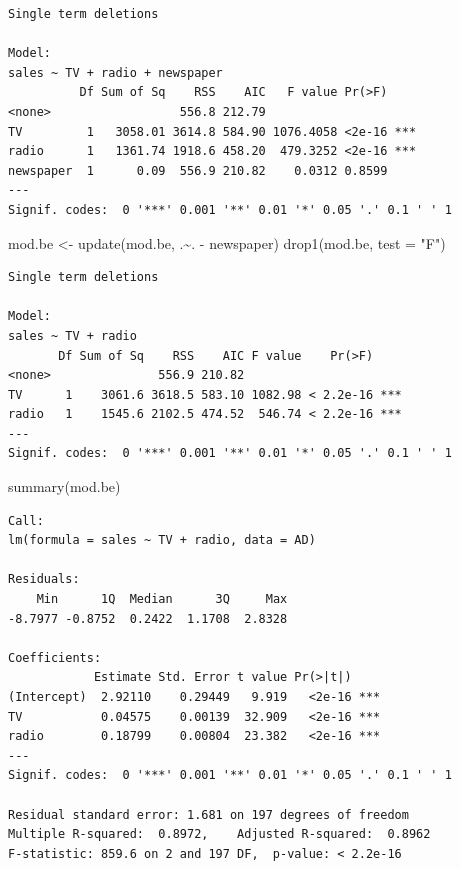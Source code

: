 \documentclass[
]{article}
\newenvironment{Shaded}{\begin{snugshade}}{\end{snugshade}}
\newcommand{\AttributeTok}[1]{\textcolor[rgb]{0.77,0.63,0.00}{#1}}
\newcommand{\FunctionTok}[1]{\textcolor[rgb]{0.00,0.00,0.00}{#1}}
\newcommand{\NormalTok}[1]{#1}
\newcommand{\OtherTok}[1]{\textcolor[rgb]{0.56,0.35,0.01}{#1}}
\newcommand{\SpecialCharTok}[1]{\textcolor[rgb]{0.00,0.00,0.00}{#1}}
\newcommand{\StringTok}[1]{\textcolor[rgb]{0.31,0.60,0.02}{#1}}
\begin{document}
\begin{verbatim}
Single term deletions

Model:
sales ~ TV + radio + newspaper
          Df Sum of Sq    RSS    AIC   F value Pr(>F)    
<none>                  556.8 212.79                     
TV         1   3058.01 3614.8 584.90 1076.4058 <2e-16 ***
radio      1   1361.74 1918.6 458.20  479.3252 <2e-16 ***
newspaper  1      0.09  556.9 210.82    0.0312 0.8599    
---
Signif. codes:  0 '***' 0.001 '**' 0.01 '*' 0.05 '.' 0.1 ' ' 1
\end{verbatim}

\begin{Shaded}
\begin{Highlighting}[]
\NormalTok{mod.be }\OtherTok{\textless{}{-}} \FunctionTok{update}\NormalTok{(mod.be, .}\SpecialCharTok{\textasciitilde{}}\NormalTok{. }\SpecialCharTok{{-}}\NormalTok{ newspaper)}
\FunctionTok{drop1}\NormalTok{(mod.be, }\AttributeTok{test =} \StringTok{"F"}\NormalTok{)}
\end{Highlighting}
\end{Shaded}

\begin{verbatim}
Single term deletions

Model:
sales ~ TV + radio
       Df Sum of Sq    RSS    AIC F value    Pr(>F)    
<none>               556.9 210.82                      
TV      1    3061.6 3618.5 583.10 1082.98 < 2.2e-16 ***
radio   1    1545.6 2102.5 474.52  546.74 < 2.2e-16 ***
---
Signif. codes:  0 '***' 0.001 '**' 0.01 '*' 0.05 '.' 0.1 ' ' 1
\end{verbatim}

\begin{Shaded}
\begin{Highlighting}[]
\FunctionTok{summary}\NormalTok{(mod.be)}
\end{Highlighting}
\end{Shaded}

\begin{verbatim}
Call:
lm(formula = sales ~ TV + radio, data = AD)

Residuals:
    Min      1Q  Median      3Q     Max 
-8.7977 -0.8752  0.2422  1.1708  2.8328 

Coefficients:
            Estimate Std. Error t value Pr(>|t|)    
(Intercept)  2.92110    0.29449   9.919   <2e-16 ***
TV           0.04575    0.00139  32.909   <2e-16 ***
radio        0.18799    0.00804  23.382   <2e-16 ***
---
Signif. codes:  0 '***' 0.001 '**' 0.01 '*' 0.05 '.' 0.1 ' ' 1

Residual standard error: 1.681 on 197 degrees of freedom
Multiple R-squared:  0.8972,    Adjusted R-squared:  0.8962 
F-statistic: 859.6 on 2 and 197 DF,  p-value: < 2.2e-16
\end{verbatim}
\end{document}

